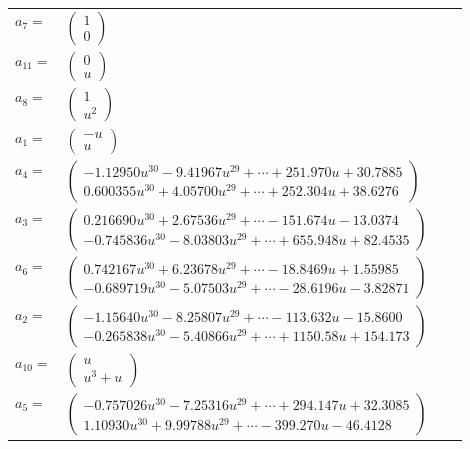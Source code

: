 \documentclass[1p]{elsarticle_modified}
\theoremstyle{definition}
\begin{document}
\begin{tabular}{m{7pt} m{180pt} m{7pt} m{180pt} }
\flushright $a_{7}=$&$\begin{pmatrix}1\\0\end{pmatrix}$ \\
\flushright $a_{11}=$&$\begin{pmatrix}0\\u\end{pmatrix}$ \\
\flushright $a_{8}=$&$\begin{pmatrix}1\\u^2\end{pmatrix}$ \\
\flushright $a_{1}=$&$\begin{pmatrix}- u\\u\end{pmatrix}$ \\
\flushright $a_{4}=$&$\begin{pmatrix}-1.12950 u^{30}-9.41967 u^{29}+\cdots+251.970 u+30.7885\\0.600355 u^{30}+4.05700 u^{29}+\cdots+252.304 u+38.6276\end{pmatrix}$ \\
\flushright $a_{3}=$&$\begin{pmatrix}0.216690 u^{30}+2.67536 u^{29}+\cdots-151.674 u-13.0374\\-0.745836 u^{30}-8.03803 u^{29}+\cdots+655.948 u+82.4535\end{pmatrix}$ \\
\flushright $a_{6}=$&$\begin{pmatrix}0.742167 u^{30}+6.23678 u^{29}+\cdots-18.8469 u+1.55985\\-0.689719 u^{30}-5.07503 u^{29}+\cdots-28.6196 u-3.82871\end{pmatrix}$ \\
\flushright $a_{2}=$&$\begin{pmatrix}-1.15640 u^{30}-8.25807 u^{29}+\cdots-113.632 u-15.8600\\-0.265838 u^{30}-5.40866 u^{29}+\cdots+1150.58 u+154.173\end{pmatrix}$ \\
\flushright $a_{10}=$&$\begin{pmatrix}u\\u^3+u\end{pmatrix}$ \\
\flushright $a_{5}=$&$\begin{pmatrix}-0.757026 u^{30}-7.25316 u^{29}+\cdots+294.147 u+32.3085\\1.10930 u^{30}+9.99788 u^{29}+\cdots-399.270 u-46.4128\end{pmatrix}$ \\

\end{tabular}
\end{document}
